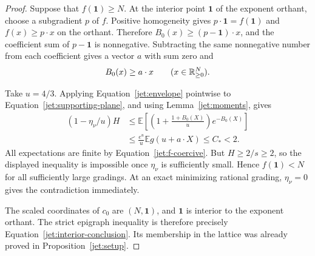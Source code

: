 \begin{proof}
Suppose that $f(\mathbf1)\ge N$. At the interior point $\mathbf1$ of
the exponent orthant, choose a subgradient $p$ of $f$. Positive
homogeneity gives $p\cdot\mathbf1=f(\mathbf1)$ and
$f(x)\ge p\cdot x$ on the orthant. Therefore
$B_0(x)\ge(p-\mathbf1)\cdot x$, and the coefficient sum of
$p-\mathbf1$ is nonnegative. Subtracting the same nonnegative number
from each coefficient gives a vector $a$ with sum zero and
\begin{equation}\label{jet:supporting-plane}
 B_0(x)\ge a\cdot x\qquad(x\in\mathbb R_{\ge0}^N).
\end{equation}

Take $u=4/3$. Applying Equation~\eqref{jet:envelope} pointwise to
Equation~\eqref{jet:supporting-plane}, and using
Lemma~\ref{jet:moments}, gives
\begin{align*}
 (1-\eta_\nu/u)H
 &\le\mathbb E\left[\left(1+\frac{1+B_0(X)}u\right)
                                      e^{-B_0(X)}\right]\\
 &\le\frac{e^u}{u}\mathbb E g(u+a\cdot X)
 \le C_*<2.
\end{align*}
All expectations are finite by Equation~\eqref{jet:f-coercive}.
But $H\ge2/s\ge2$, so the displayed inequality is impossible once
$\eta_\nu$ is sufficiently small. Hence $f(\mathbf1)<N$ for all
sufficiently large gradings. At an exact minimizing rational grading,
$\eta_\nu=0$ gives the contradiction immediately.

The scaled coordinates of $c_0$ are $(N,\mathbf1)$, and
$\mathbf1$ is interior to the exponent orthant. The strict epigraph
inequality is therefore precisely
Equation~\eqref{jet:interior-conclusion}. Its membership in the lattice
was already proved in Proposition~\ref{jet:setup}.
\end{proof}
